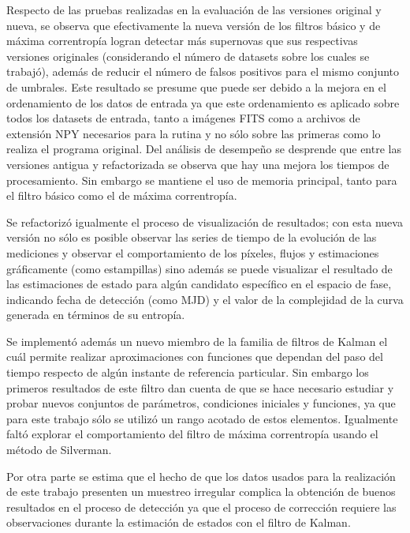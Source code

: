 Respecto de las pruebas realizadas en la evaluaci\'on de las versiones original y nueva, se observa que efectivamente la nueva versi\'on de los filtros b\'asico y de m\'axima correntrop\'ia logran detectar m\'as supernovas que sus respectivas versiones originales (considerando el n\'umero de datasets sobre los cuales se trabaj\'o), adem\'as de reducir el n\'umero de falsos positivos para el mismo conjunto de umbrales. Este resultado se presume que puede ser debido a la mejora en el ordenamiento de los datos de entrada ya que este ordenamiento es aplicado sobre todos los datasets de entrada, tanto a im\'agenes FITS como a archivos de extensi\'on NPY necesarios para la rutina y no s\'olo sobre las primeras como lo realiza el programa original. Del an\'alisis de desempe\~no se desprende que entre las versiones antigua y refactorizada se observa que hay una mejora los tiempos de procesamiento. Sin embargo se mantiene el uso de memoria principal, tanto para el filtro b\'asico como el de m\'axima correntrop\'ia. 
\bigskip

Se refactoriz\'o igualmente el proceso de visualizaci\'on de resultados; con esta nueva versi\'on no s\'olo es posible observar las series de tiempo de la evoluci\'on de las mediciones y observar el comportamiento de los p\'ixeles, flujos y estimaciones gr\'aficamente (como estampillas) sino adem\'as se puede visualizar el resultado de las estimaciones de estado para alg\'un candidato espec\'ifico en el espacio de fase, indicando fecha de detecci\'on (como MJD) y el valor de la complejidad de la curva generada en t\'erminos de su entrop\'ia.
\bigskip

Se implement\'o adem\'as un nuevo miembro de la familia de filtros de Kalman el cu\'al permite realizar aproximaciones con funciones que dependan del paso del tiempo respecto de alg\'un instante de referencia particular. Sin embargo los primeros resultados de este filtro dan cuenta de que se hace necesario estudiar y probar nuevos conjuntos de par\'ametros, condiciones iniciales y funciones, ya que para este trabajo s\'olo se utiliz\'o un rango acotado de estos elementos. Igualmente falt\'o explorar el comportamiento del filtro de m\'axima correntrop\'ia usando el m\'etodo de Silverman.  
\bigskip

Por otra parte se estima que el hecho de que los datos usados para la realizaci\'on de este trabajo presenten un muestreo irregular complica la obtenci\'on de buenos resultados en el proceso de detecci\'on ya que el proceso de correcci\'on requiere las observaciones durante la estimaci\'on de estados con el filtro de Kalman.
\bigskip 

